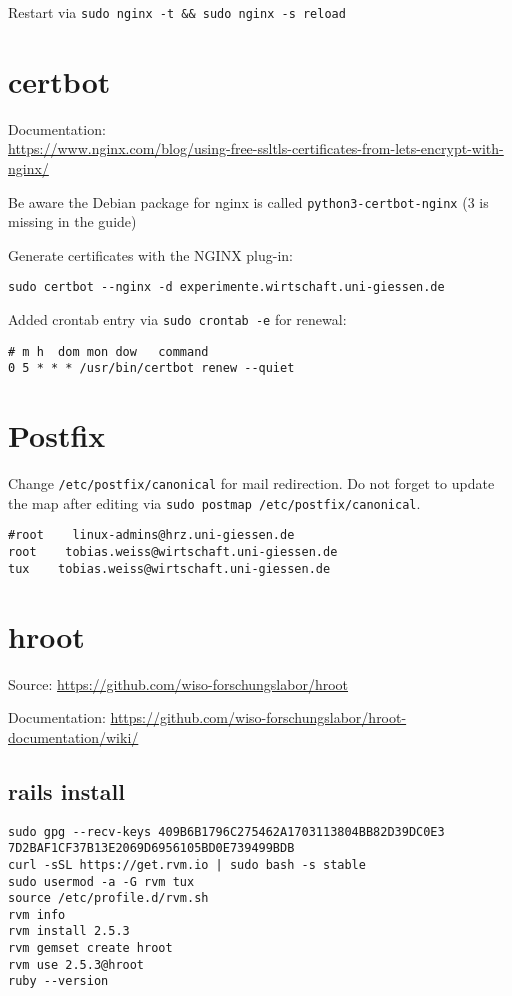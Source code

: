 \documentclass{article}
\begin{document}
Restart via \verb|sudo nginx -t && sudo nginx -s reload|

\section{certbot}
Documentation: \\
\url{https://www.nginx.com/blog/using-free-ssltls-certificates-from-lets-encrypt-with-nginx/}

Be aware the Debian package for nginx is called \verb|python3-certbot-nginx| (3 is missing in the guide)

Generate certificates with the NGINX plug-in:
\begin{verbatim}
sudo certbot --nginx -d experimente.wirtschaft.uni-giessen.de
\end{verbatim}

Added crontab entry via \verb|sudo crontab -e| for renewal:
\begin{lstlisting}
# m h  dom mon dow   command
0 5 * * * /usr/bin/certbot renew --quiet
\end{lstlisting}

\section{Postfix}
Change \verb|/etc/postfix/canonical| for mail redirection.
Do not forget to update the map after editing via \verb|sudo postmap /etc/postfix/canonical|.
\begin{lstlisting}
#root    linux-admins@hrz.uni-giessen.de
root    tobias.weiss@wirtschaft.uni-giessen.de
tux    tobias.weiss@wirtschaft.uni-giessen.de
\end{lstlisting}


\section{hroot}
Source: \url{https://github.com/wiso-forschungslabor/hroot}

Documentation: \url{https://github.com/wiso-forschungslabor/hroot-documentation/wiki/}

\subsection{rails install}
\begin{lstlisting}
sudo gpg --recv-keys 409B6B1796C275462A1703113804BB82D39DC0E3 7D2BAF1CF37B13E2069D6956105BD0E739499BDB
curl -sSL https://get.rvm.io | sudo bash -s stable
sudo usermod -a -G rvm tux
source /etc/profile.d/rvm.sh
rvm info
rvm install 2.5.3
rvm gemset create hroot
rvm use 2.5.3@hroot
ruby --version
\end{lstlisting}
\end{document}

